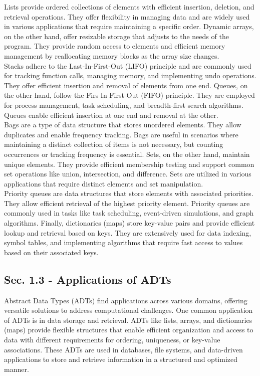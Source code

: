 Lists provide ordered collections of elements with efficient insertion, deletion, and retrieval operations. They offer flexibility in managing data and are widely used in various applications that
require maintaining a specific order. Dynamic arrays, on the other hand, offer resizable storage that adjusts to the needs of the program. They provide random access to elements and efficient memory management
by reallocating memory blocks as the array size changes. \\

\noindent Stacks adhere to the Last-In-First-Out (LIFO) principle and are commonly used for tracking function calls, managing memory, and implementing undo operations. They offer efficient insertion and removal
of elements from one end. Queues, on the other hand, follow the Firs-In-First-Out (FIFO) principle. They are employed for process management, task scheduling, and breadth-first search algorithms. Queues enable
efficient insertion at one end and removal at the other. \\

\noindent Bags are a type of data structure that stores unordered elements. They allow duplicates and enable frequency tracking. Bags are useful in scenarios where maintaining a distinct collection of items is not
necessary, but counting occurrences or tracking frequency is essential. Sets, on the other hand, maintain unique elements. They provide efficient membership testing and support common set operations like union,
intersection, and difference. Sets are utilized in various applications that require distinct elements and set manipulation. \\

\noindent Priority queues are data structures that store elements with associated priorities. They allow efficient retrieval of the highest priority element. Priority queues are commonly used in tasks like task
scheduling, event-driven simulations, and graph algorithms. Finally, dictionaries (maps) store key-value pairs and provide efficient lookup and retrieval based on keys. They are extensively used for data indexing,
symbol tables, and implementing algorithms that require fast access to values based on their associated keys. \\

\subsection{Sec. 1.3 - Applications of ADTs}
Abstract Data Types (ADTs) find applications across various domains, offering versatile solutions to address computational challenges. One common application of ADTs is in data storage and retrieval. ADTs like lists,
arrays, and dictionaries (maps) provide flexible structures that enable efficient organization and access to data with different requirements for ordering, uniqueness, or key-value associations. These ADTs are used in
databases, file systems, and data-driven applications to store and retrieve information in a structured and optimized manner. \\

